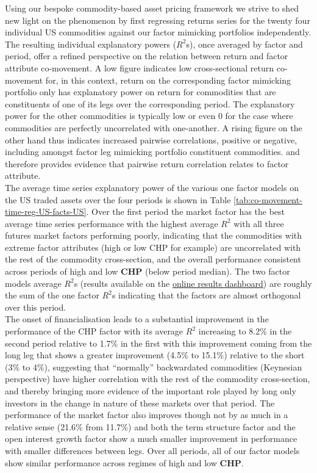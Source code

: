 \documentclass[]{elsarticle} %
\begin{document}
\bigskip\bigskip\setlength{\parindent}{0pt}

Using our bespoke commodity-based asset pricing framework we strive to shed new light on the phenomenon by first regressing returns series for the twenty four individual US commodities against our factor mimicking portfolios independently. The resulting individual explanatory powers (\(R^2\)s), once averaged by factor and period, offer a refined perspective on the relation between return and factor attribute co-movement. A low figure indicates low cross-sectional return co-movement for, in this context, return on the corresponding factor mimicking portfolio only has explanatory power on return for commodities that are constituents of one of its legs over the corresponding period. The explanatory power for the other commodities is typically low or even 0 for the case where commodities are perfectly uncorrelated with one-another. A rising figure on the other hand thus indicates increased pairwise correlations, positive or negative, including amongst factor leg mimicking portfolio constituent commodities. and therefore provides evidence that pairwise return correlation relates to factor attribute.\\
The average time series explanatory power of the various one factor models on the US traded assets over the four periods is shown in Table \ref{tab:co-movement-time-reg-US-facts-US}. Over the first period the market factor has the best average time series performance with the highest average \(R^{2}\) with all three futures market factors performing poorly, indicating that the commodities with extreme factor attributes (high or low CHP for example) are uncorrelated with the rest of the commodity cross-section, and the overall performance consistent across periods of high and low \textbf{CHP} (below period median). The two factor models average \(R^{2}\)s (results available on the \href{http://18.135.131.217:3838/financialization-asset-pricing/}{online results dashboard}) are roughly the sum of the one factor \(R^{2}\)s indicating that the factors are almost orthogonal over this period.\\
The onset of financialisation leads to a substantial improvement in the performance of the CHP factor with its average \(R^{2}\) increasing to 8.2\% in the second period relative to 1.7\% in the first with this improvement coming from the long leg that shows a greater improvement (4.5\% to 15.1\%) relative to the short (3\% to 4\%), suggesting that ``normally'' backwardated commodities (Keynesian perspective) have higher correlation with the rest of the commodity cross-section, and thereby bringing more evidence of the important role played by long only investors in the change in nature of these markets over that period. The performance of the market factor also improves though not by as much in a relative sense (21.6\% from 11.7\%) and both the term structure factor and the open interest growth factor show a much smaller improvement in performance with smaller differences between legs. Over all periods, all of our factor models show similar performance across regimes of high and low \textbf{CHP}.
\end{document}
